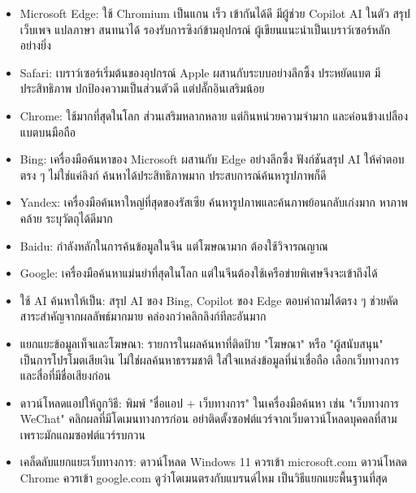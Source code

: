 \begin{itemize}
  \item Microsoft Edge: ใช้ Chromium เป็นแกน เร็ว เข้ากันได้ดี มีผู้ช่วย Copilot AI ในตัว สรุปเว็บเพจ แปลภาษา สนทนาได้ รองรับการซิงก์ข้ามอุปกรณ์ ผู้เขียนแนะนำเป็นเบราว์เซอร์หลักอย่างยิ่ง
  \item Safari: เบราว์เซอร์เริ่มต้นของอุปกรณ์ Apple ผสานกับระบบอย่างลึกซึ้ง ประหยัดแบต มีประสิทธิภาพ ปกป้องความเป็นส่วนตัวดี แต่ปลั๊กอินเสริมน้อย
  \item Chrome: ใช้มากที่สุดในโลก ส่วนเสริมหลากหลาย แต่กินหน่วยความจำมาก และค่อนข้างเปลืองแบตบนมือถือ
\end{itemize}


\begin{itemize}
  \item Bing: เครื่องมือค้นหาของ Microsoft ผสานกับ Edge อย่างลึกซึ้ง ฟังก์ชันสรุป AI ให้คำตอบตรง ๆ ไม่ใช่แค่ลิงก์ ค้นหาได้ประสิทธิภาพมาก ประสบการณ์ค้นหารูปภาพก็ดี
  \item Yandex: เครื่องมือค้นหาใหญ่ที่สุดของรัสเซีย ค้นหารูปภาพและค้นภาพย้อนกลับเก่งมาก หาภาพคล้าย ระบุวัตถุได้ดีมาก
  \item Baidu: กำลังหลักในการค้นข้อมูลในจีน แต่โฆษณามาก ต้องใช้วิจารณญาณ
  \item Google: เครื่องมือค้นหาแม่นยำที่สุดในโลก แต่ในจีนต้องใช้เครือข่ายพิเศษจึงจะเข้าถึงได้
\end{itemize}


\begin{itemize}
  \item ใช้ AI ค้นหาให้เป็น: สรุป AI ของ Bing, Copilot ของ Edge ตอบคำถามได้ตรง ๆ ช่วยคัดสาระสำคัญจากผลลัพธ์มากมาย คล่องกว่าคลิกลิงก์ทีละอันมาก
  \item แยกแยะข้อมูลเท็จและโฆษณา: รายการในผลค้นหาที่ติดป้าย "โฆษณา" หรือ "ผู้สนับสนุน" เป็นการโปรโมตเสียเงิน ไม่ใช่ผลค้นหาธรรมชาติ ใส่ใจแหล่งข้อมูลที่น่าเชื่อถือ เลือกเว็บทางการและสื่อที่มีชื่อเสียงก่อน
  \item ดาวน์โหลดแอปให้ถูกวิธี: พิมพ์ "ชื่อแอป + เว็บทางการ" ในเครื่องมือค้นหา เช่น "เว็บทางการ WeChat" คลิกผลที่มีโดเมนทางการก่อน อย่าติดตั้งซอฟต์แวร์จากเว็บดาวน์โหลดบุคคลที่สาม เพราะมักแถมซอฟต์แวร์รบกวน
  \item เคล็ดลับแยกแยะเว็บทางการ: ดาวน์โหลด Windows 11 ควรเข้า microsoft.com ดาวน์โหลด Chrome ควรเข้า google.com ดูว่าโดเมนตรงกับแบรนด์ไหม เป็นวิธีแยกแยะพื้นฐานที่สุด
\end{itemize}

